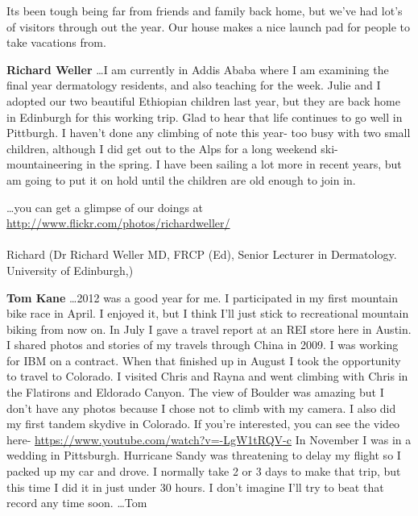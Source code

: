\documentclass[10pt,a4paper]{article}
\begin{document}
\begin{multicols}{2}
    Its been tough being far from friends and family back home, but we've had lot's of visitors through out the year. Our house makes a nice launch pad for people to take vacations from.   

\vspace{10pt}

\textbf{Richard Weller}
\dots I  am currently in Addis Ababa where I am examining the final year dermatology residents, and also teaching for the week. Julie and I adopted our two beautiful Ethiopian children last year, but they are back home in Edinburgh for this working trip.
   Glad to hear that life continues to go well in Pittburgh.  I haven't done any climbing  of note this year- too busy with two small children, although I did get out to the Alps for a long weekend ski-mountaineering in the spring.  I have been sailing a lot more in recent years, but am going to put it on hold until the children are old enough to join in.
  
  	\dots you  can get a glimpse of our doings at \url{http://www.flickr.com/photos/richardweller/}
\\
\\
Richard (Dr Richard Weller MD, FRCP (Ed), Senior Lecturer in Dermatology. University of Edinburgh,)

\vspace{10pt}

\textbf{Tom Kane}
\dots 2012 was a good year for me. I participated in my first mountain bike race in April. I enjoyed it, but I think I'll just stick to recreational mountain biking from now on. In July I gave a travel report at an REI store here in Austin. I shared photos and stories of my travels through China in 2009.
    I was working for IBM on a contract. When that finished up in August I took the opportunity to travel to Colorado. I visited Chris and Rayna and went climbing with Chris in the Flatirons and Eldorado Canyon. The view of Boulder was amazing but I don't have any photos because I chose not to climb with my camera. I also did my first tandem skydive in Colorado. If you're interested, you can see the video here- \url{https://www.youtube.com/watch?v=-LgW1tRQV-c}
    In November I was in a wedding in Pittsburgh. Hurricane Sandy was threatening to delay my flight so I packed up my car and drove. I normally take 2 or 3 days to make that trip, but this time I did it in just under 30 hours. I don't imagine I'll try to beat that record any time soon.    \dots  Tom

\vspace{10pt}


\end{multicols}
\end{document}
